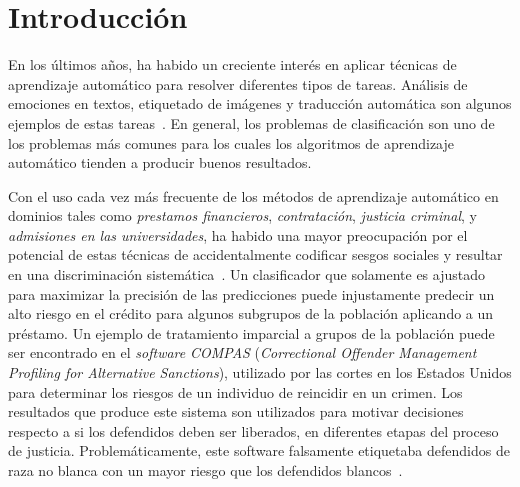\chapter*{Introducción}\label{chapter:introduction}



En los últimos años, ha habido un creciente interés en aplicar técnicas de aprendizaje automático para resolver diferentes tipos de tareas.
Análisis de emociones en textos, etiquetado de imágenes y traducción automática son algunos ejemplos de estas tareas~\parencite{bahdanau2014neural,ucidata,mnih2013machine,yavuz2022comparison}.
En general, los problemas de clasificación son uno de los problemas más comunes para los cuales los algoritmos de aprendizaje automático tienden a producir buenos resultados.


Con el uso cada vez más frecuente de los métodos de aprendizaje automático en dominios tales como \emph{prestamos financieros}, \emph{contratación}, \emph{justicia criminal}, y \emph{admisiones en las universidades}, ha habido una mayor preocupación por el potencial de estas técnicas de accidentalmente codificar sesgos sociales y resultar en una discriminación sistemática~\parencite{prorepublica2016bias,barocas-hardt-narayanan,NIPS2016_a486cd07,Buolamwini2018GenderSI,caliskan2017semantics}.
Un clasificador que solamente es ajustado para maximizar la precisión de las predicciones puede injustamente predecir un alto riesgo en el crédito para algunos subgrupos de la población aplicando a un préstamo.
Un ejemplo de tratamiento imparcial a grupos de la población puede ser encontrado en el \emph{software} \emph{COMPAS} (\emph{Correctional Offender Management Profiling for Alternative Sanctions}), utilizado por las cortes en los Estados Unidos para determinar los riesgos de un individuo de reincidir en un crimen.
Los resultados que produce este sistema son utilizados para motivar decisiones respecto a si los defendidos deben ser liberados, en diferentes etapas del proceso de justicia.
Problemáticamente, este software falsamente etiquetaba defendidos de raza no blanca con un mayor riesgo que los defendidos blancos~\parencite{prorepublica2016bias}.


